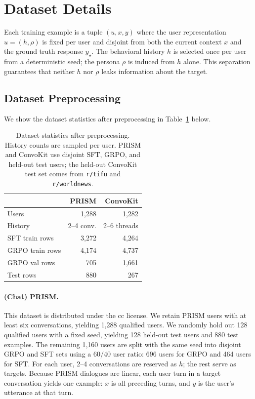 \documentclass{article} %
\begin{document}
\clearpage

\appendix

\section{Dataset Details}
\label{app:dataset-stats}

Each training example is a tuple $(u, x, y)$ where the user representation $u = (h, \rho)$ is fixed per user and disjoint from both the current context $x$ and the ground truth response $y_{\star}$. The behavioral history $h$ is selected once per user from a deterministic seed; the persona $\rho$ is induced from $h$ alone. This separation guarantees that neither $h$ nor $\rho$ leaks information about the target.

\subsection{Dataset Preprocessing}

We show the dataset statistics after preprocessing in Table~\ref{tab:preprocessing_stats} below.

\begin{table}[h]
\centering
\small
\begin{tabular}{lrr}
\toprule
 & PRISM & ConvoKit \\
\midrule
Users & 1,288 & 1,282 \\
History & 2--4 conv. & 2--6 threads \\
SFT train rows & 3,272 & 4,264 \\
GRPO train rows & 4,174 & 4,737 \\
GRPO val rows & 705 & 1,661 \\
Test rows & 880 & 267 \\
\bottomrule
\end{tabular}
\caption{Dataset statistics after preprocessing. History counts are sampled per user. PRISM and ConvoKit use disjoint SFT, GRPO, and held-out test users; the held-out ConvoKit test set comes from \texttt{r/tifu} and \texttt{r/worldnews}.}
\label{tab:preprocessing_stats}
\end{table}

\paragraph{(Chat) PRISM.}
This dataset is distributed under the cc license. We retain PRISM users with at least six conversations, yielding 1,288 qualified users. We randomly hold out 128 qualified users with a fixed seed, yielding 128 held-out test users and 880 test examples. The remaining 1,160 users are split with the same seed into disjoint GRPO and SFT sets using a 60/40 user ratio: 696 users for GRPO and 464 users for SFT. For each user, 2--4 conversations are reserved as $h$; the rest serve as targets. Because PRISM dialogues are linear, each user turn in a target conversation yields one example: $x$ is all preceding turns, and $y$ is the user's utterance at that turn.
\end{document}
